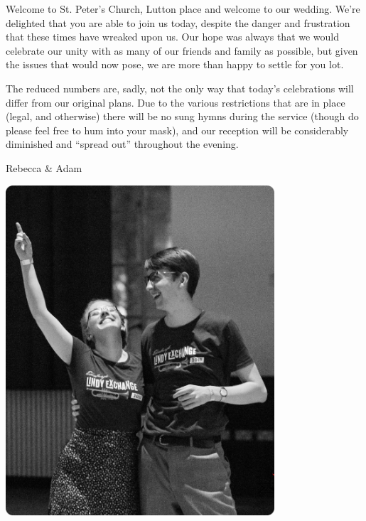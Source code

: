 \documentclass[a4paper,10pt,titlepage]{article}
\begin{document}
\hspace{2em}Welcome to St. Peter's Church, Lutton place and welcome to our wedding. We're delighted that you are able to join us today, despite the danger and frustration that these times have wreaked upon us. Our hope was always that we would celebrate our unity with as many of our friends and family as possible, but given the issues that would now pose, we are more than happy to settle for you lot. 

\hspace{2em}The reduced numbers are, sadly, not the only way that today's celebrations will differ from our original plans. Due to the various restrictions that are in place (legal, and otherwise) there will be no sung hymns during the service (though do please feel free to hum into your mask), and our reception will be considerably diminished and ``spread out'' throughout the evening.

\begin{flushright}
Rebecca \& Adam
\end{flushright}

\vspace{\fill}
{\centering
\includegraphics[width=0.75\textwidth]{us-round.png}\par
}
\vspace{\fill}

\let\thefootnote\relax{}
\end{document}
